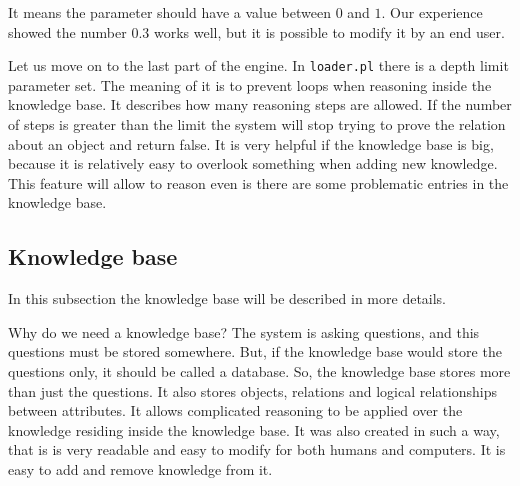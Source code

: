 \documentclass[a4paper]{article}
\begin{document}
It means the parameter should have a value between \(0\) and \(1\). Our experience showed the number \(0.3\) works well, but it is possible to modify it by an end user.

Let us move on to the last part of the engine. In \verb|loader.pl| there is a depth limit parameter set. The meaning of it is to prevent loops when reasoning inside the knowledge base. It describes how many reasoning steps are allowed. If the number of steps is greater than the limit the system will stop trying to prove the relation about an object and return false. It is very helpful if the knowledge base is big, because it is relatively easy to overlook something when adding new knowledge. This feature will allow to reason even is there are some problematic entries in the knowledge base.
\subsection{Knowledge base}
In this subsection the knowledge base will be described in more details.

Why do we need a knowledge base? The system is asking questions, and this questions must be stored somewhere. But, if the knowledge base would store the questions only, it should be called a database. So, the knowledge base stores more than just the questions. It also stores objects, relations and logical relationships between attributes. It allows complicated reasoning to be applied over the knowledge residing inside the knowledge base. It was also created in such a way, that is is very readable and easy to modify for both humans and computers. It is easy to add and remove knowledge from it.
\end{document}
